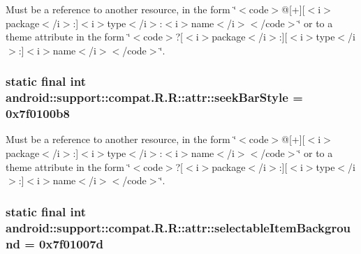 Must be a reference to another resource, in the form \char`\"{}$<$code$>$@\mbox{[}+\mbox{]}\mbox{[}$<$i$>$package$<$/i$>$:\mbox{]}$<$i$>$type$<$/i$>$:$<$i$>$name$<$/i$>$$<$/code$>$\char`\"{} or to a theme attribute in the form \char`\"{}$<$code$>$?\mbox{[}$<$i$>$package$<$/i$>$:\mbox{]}\mbox{[}$<$i$>$type$<$/i$>$:\mbox{]}$<$i$>$name$<$/i$>$$<$/code$>$\char`\"{}. \hypertarget{classandroid_1_1support_1_1compat_1_1_r_1_1attr_f4ebc47abcc9ccb1417be11a7b6d09c2}{
\subsubsection[{seekBarStyle}]{\setlength{\rightskip}{0pt plus 5cm}static final int android::support::compat.R.R::attr::seekBarStyle = 0x7f0100b8}}
\label{classandroid_1_1support_1_1compat_1_1_r_1_1attr_f4ebc47abcc9ccb1417be11a7b6d09c2}


Must be a reference to another resource, in the form \char`\"{}$<$code$>$@\mbox{[}+\mbox{]}\mbox{[}$<$i$>$package$<$/i$>$:\mbox{]}$<$i$>$type$<$/i$>$:$<$i$>$name$<$/i$>$$<$/code$>$\char`\"{} or to a theme attribute in the form \char`\"{}$<$code$>$?\mbox{[}$<$i$>$package$<$/i$>$:\mbox{]}\mbox{[}$<$i$>$type$<$/i$>$:\mbox{]}$<$i$>$name$<$/i$>$$<$/code$>$\char`\"{}. \hypertarget{classandroid_1_1support_1_1compat_1_1_r_1_1attr_202b48f27ca523b6e38366426611730b}{
\subsubsection[{selectableItemBackground}]{\setlength{\rightskip}{0pt plus 5cm}static final int android::support::compat.R.R::attr::selectableItemBackground = 0x7f01007d}}
\label{classandroid_1_1support_1_1compat_1_1_r_1_1attr_202b48f27ca523b6e38366426611730b}


